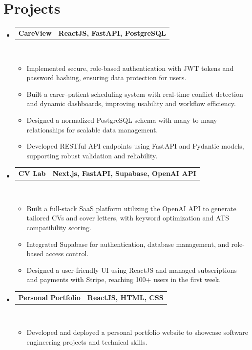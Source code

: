 \documentclass[letterpaper,11pt]{article}
\makeatletter
\newcommand{\resumeItem}[1]{
  \item\small{
    {#1 \vspace{0pt}}
  }
}
\newcommand{\resumeProjectHeading}[2]{
    \item
    \begin{tabular*}{1.001\textwidth}{l@{\extracolsep{\fill}}r}
      \small#1 & \textbf{\small #2}\\
    \end{tabular*}\vspace{-7pt}
}
\newcommand{\resumeSubHeadingListStart}{\begin{itemize}[leftmargin=0.0in, label={}]}
\newcommand{\resumeSubHeadingListEnd}{\end{itemize}}\vspace{0pt}
\newcommand{\resumeItemListStart}{\begin{itemize}}
\newcommand{\resumeItemListEnd}{\end{itemize}\vspace{-5pt}}
\makeatother
\begin{document}
\section{Projects} 
    \resumeSubHeadingListStart

        \resumeProjectHeading
            {\textbf{CareView}}
            {{ReactJS, FastAPI, PostgreSQL}}
            \\[5mm]
            \resumeItemListStart
                \resumeItem{Implemented secure, role-based authentication with JWT tokens and password hashing, ensuring data protection for users.}
                \resumeItem{Built a carer–patient scheduling system with real-time conflict detection and dynamic dashboards, improving usability and workflow efficiency.}
                \resumeItem{Designed a normalized PostgreSQL schema with many-to-many relationships for scalable data management.}
                \resumeItem{Developed RESTful API endpoints using FastAPI and Pydantic models, supporting robust validation and reliability.}
            \resumeItemListEnd
            \vspace{-10pt}

         \resumeProjectHeading
            {\textbf{CV Lab}}
            {{Next.js, FastAPI, Supabase, OpenAI API}}
            \\[5mm]
            \resumeItemListStart
                \resumeItem{Built a full-stack SaaS platform utilizing the OpenAI API to generate tailored CVs and cover letters, with keyword optimization and ATS compatibility scoring.}
                \resumeItem{Integrated Supabase for authentication, database management, and role-based access control.}
                \resumeItem{Designed a user-friendly UI using ReactJS and managed subscriptions and payments with Stripe, reaching 100+ users in the first week.}
            \resumeItemListEnd
            \vspace{-10pt}

         \resumeProjectHeading
            {\textbf{Personal Portfolio}}
            {{ReactJS, HTML, CSS}}
            \\[5mm]
            \resumeItemListStart
                \resumeItem{Developed and deployed a personal portfolio website to showcase software engineering projects and technical skills.}
            \resumeItemListEnd

    \resumeSubHeadingListEnd


\end{document}
